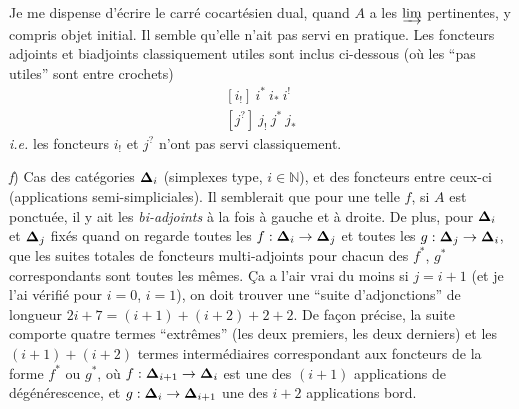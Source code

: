 \clearpage



Je me dispense d'écrire le carré cocartésien dual, quand $A$ a les $\varinjlim$ pertinentes, y compris objet initial. Il semble qu'elle n'ait pas servi en pratique. Les foncteurs adjoints et biadjoints classiquement utiles sont inclus ci-dessous (où les “pas utiles” sont entre crochets)
\[
\begin{aligned}
{}[i_{!}]\ i^{*}\ i_{*}\ i^{!} \\
[j^{?}]\ j_{!}\ j^{*}\ j_{*}
\end{aligned}
\]
\textit{i.e.} les foncteurs $i_{!}$ et $j^{?}$ n'ont pas servi classiquement.

\textit{f}) Cas des catégories $\boldsymbol{\Delta}_{i}$ (simplexes type, $i\in\mathbb{N}$), et des foncteurs entre ceux-ci (applications semi-simpliciales). Il semblerait que pour une telle $f$, si $A$ est ponctuée, il y ait les \textit{bi-adjoints} à la fois à gauche et à droite. De plus, pour $\boldsymbol{\Delta}_{i}$ et $\boldsymbol{\Delta}_{j}$ fixés quand on regarde toutes les $f:\boldsymbol{\Delta}_{i}\to\boldsymbol{\Delta}_{j}$ et toutes les $g:\boldsymbol{\Delta}_{j}\to\boldsymbol{\Delta}_{i}$, que les suites totales de foncteurs multi-adjoints pour chacun des $f^{*}$, $g^{*}$ correspondants sont toutes les mêmes. Ça a l'air vrai du moins si $j=i+1$ (et je l'ai vérifié pour $i=0$, $i=1$), on doit trouver une “suite d'adjonctions” de longueur $2i+7=(i+1)+(i+2)+2+2$. De façon précise, la suite comporte quatre termes “extrêmes” (les deux premiers, les deux derniers) et les $(i+1)+(i+2)$ termes intermédiaires correspondant aux foncteurs de la forme $f^{*}$ ou $g^{*}$, où $f:\boldsymbol{\Delta}_{i+1}\to\boldsymbol{\Delta}_{i}$ est une des $(i+1)$ applications de dégénérescence, et $g:\boldsymbol{\Delta}_{i}\to\boldsymbol{\Delta}_{i+1}$ une des $i+2$ applications bord.



